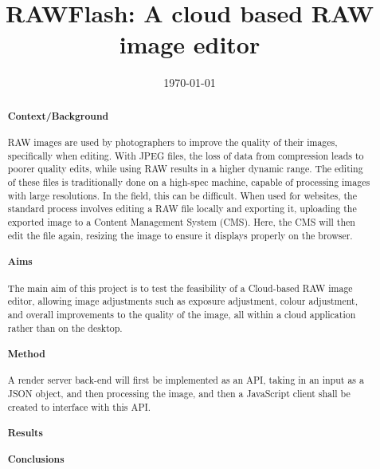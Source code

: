 \documentclass[12pt,a4paper]{article}
\title{RAWFlash: A cloud based RAW image editor}
\author{} %
\date{\today}
\begin{document}
\maketitle

\begin{abstract}

\paragraph{Context/Background}
RAW images are used by photographers to improve the quality of their images, specifically when editing. With JPEG files, the loss of 
data from compression leads to poorer quality edits, while using RAW results in a higher dynamic range. The editing of these files is 
traditionally done on a high-spec machine, capable of processing images with large resolutions. In the field, this can be difficult. 
When used for websites, the standard process involves editing a RAW file locally and exporting it, uploading the exported image to a 
Content Management System (CMS). Here, the CMS will then edit the file again, resizing the image to ensure it displays properly on the
browser.

\paragraph{Aims}
The main aim of this project is to test the feasibility of a Cloud-based RAW image editor, allowing image adjustments such as exposure 
adjustment, colour adjustment, and overall improvements to the quality of the image, all within a cloud application rather than on the 
desktop.

\paragraph{Method}
A render server back-end will first be implemented as an API, taking in an input as a JSON object, and then processing the image, and 
then a JavaScript client shall be created to interface with this API.

\paragraph{Results}

\paragraph{Conclusions}

\end{abstract}
\end{document}
